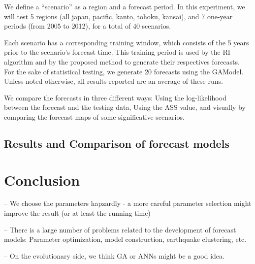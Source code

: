 \documentclass{sig-alternate}
\begin{document}
We define a ``scenario'' as a region and a forecast period. In this
experiment, we will test 5 regions (all japan, pacific, kanto, tohoku,
kansai), and 7 one-year periods (from 2005 to 2012), for a total of 40
scenarios.

Each scenario has a corresponding training window, which consists of
the 5 years prior to the scenario's forecast time. This training
period is used by the RI algorithm and by the proposed method to
generate their respectives forecasts. For the sake of statistical
testing, we generate 20 forecasts using the GAModel. Unless noted
otherwise, all results reported are an average of these runs.

We compare the forecasts in three different ways: Using the
log-likelihood between the forecast and the testing data, Using the
ASS value, and visually by comparing the forecast maps of some
significative scenarios.

\subsection{Results and Comparison of forecast models}





\section{Conclusion}


-- We choose the parameters hapzardly - a more careful parameter
selection might improve the result (or at least the running time)


-- There is a large number of problems related to the development of
forecast models: Parameter optimization, model construction,
earthquake clustering, etc.

-- On the evolutionary side, we think GA or ANNs might be a good idea.
\end{document}

